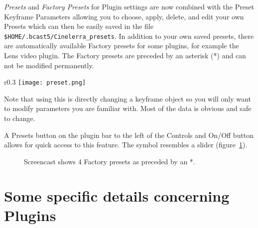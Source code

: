 \textit{Presets} and \textit{Factory Presets} for Plugin settings are now combined with the Preset Keyframe Parameters allowing you to choose, apply, delete, and edit your own Presets which can then be easily saved in the file \texttt{\$HOME/.bcast5/Cinelerra\_presets}. In addition to your own saved presets, there are automatically available Factory presets for some plugins, for example the Lens video plugin. The Factory presets are preceded by an asterisk (*) and can not be modified permanently.

\begin{wrapfigure}[4]{r}{0.3\linewidth}
    \vspace{-2ex}
    \centering
    \texttt{[image: preset.png]}
\end{wrapfigure}
Note that using this is directly changing a keyframe object so you will only want to modify parameters you are familiar with. Most of the data is obvious and safe to change.

A Presets button on the plugin bar to the left of the Controls and On/Off button allows for quick access to this feature. The symbol resembles a slider (figure~\ref{fig:preset02}).

\begin{figure}[htpb]
    \centering
    \caption{Screencast shows 4 Factory presets as preceded by an *.}
    \label{fig:preset02}
\end{figure}

\section{Some specific details concerning Plugins}%
\label{sec:specific_details_plugins}

